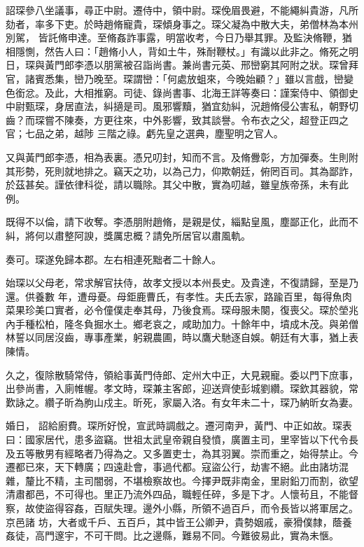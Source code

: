 \begin{pinyinscope}
 詔琛參八坐議事，尋正中尉。遷侍中，領中尉。琛俛眉畏避，不能繩糾貴游，凡所劾者，率多下吏。於時趙脩寵貴，琛傾身事之。琛父凝為中散大夫，弟僧林為本州別駕，
 皆託脩申達。至脩姦詐事露，明當收考，今日乃舉其罪。及監決脩鞭，猶相隱惻，然告人曰：「趙脩小人，背如土牛，殊耐鞭杖。」有識以此非之。脩死之明日，琛與黃門郎李憑以朋黨被召詣尚書。兼尚書元英、邢巒窮其阿附之狀。琛曾拜官，諸賓悉集，巒乃晚至。琛謂巒：「何處放蛆來，今晚始顧？」雖以言戲，巒變色銜忿。及此，大相推窮。司徒、錄尚書事、北海王詳等奏曰：謹案侍中、領御史中尉甄琛，身居直法，糾擿是司。風邪響黷，猶宜劾糾，況趙脩侵公害私，朝野切齒？而琛嘗不陳奏，方更往來，中外影響，致其談譽。令布衣之父，超登正四之官；七品之弟，越陟
 三階之祿。虧先皇之選典，塵聖明之官人。



 又與黃門郎李憑，相為表裏。憑兄叨封，知而不言。及脩釁彰，方加彈奏。生則附其形勢，死則就地排之。竊天之功，以為己力，仰欺朝廷，俯罔百司。其為鄙詐，於茲甚矣。謹依律科從，請以職除。其父中散，實為叨越，雖皇族帝孫，未有此例。



 既得不以倫，請下收奪。李憑朋附趙脩，是親是仗，緇點皇風，塵鄙正化，此而不糾，將何以肅整阿諛，獎厲忠概？請免所居官以肅風軌。



 奏可。琛遂免歸本郡。左右相連死黜者二十餘人。



 始琛以父母老，常求解官扶侍，故孝文授以本州長史。及貴達，不復請歸，至是乃還。供養數
 年，遭母憂。母鉅鹿曹氏，有孝性。夫氏去家，路踰百里，每得魚肉菜果珍美口實者，必令僮僕走奉其母，乃後食焉。琛母服未闋，復喪父。琛於塋兆內手種松柏，隆冬負掘水土。鄉老哀之，咸助加力。十餘年中，墳成木茂。與弟僧林誓以同居沒齒，專事產業，躬親農圃，時以鷹犬馳逐自娛。朝廷有大事，猶上表陳情。



 久之，復除散騎常侍，領給事黃門侍郎、定州大中正，大見親寵。委以門下庶事，出參尚書，入廁帷幄。孝文時，琛兼主客郎，迎送齊使彭城劉纘。琛欽其器貌，常歎詠之。纘子昕為朐山戍主。昕死，家屬入洛。有女年未二十，琛乃納昕女為妻。



 婚日，
 詔給廚費。琛所好悅，宣武時調戲之。遷河南尹，黃門、中正如故。琛表曰：國家居代，患多盜竊。世祖太武皇帝親自發憤，廣置主司，里宰皆以下代令長及五等散男有經略者乃得為之。又多置吏士，為其羽翼。崇而重之，始得禁止。今遷都已來，天下轉廣；四遠赴會，事過代都。寇盜公行，劫害不絕。此由諸坊混雜，釐比不精，主司闇弱，不堪檢察故也。今擇尹既非南金，里尉鉛刀而割，欲望清肅都邑，不可得也。里正乃流外四品，職輕任碎，多是下才。人懷茍且，不能督察，故使盜得容姦，百賦失理。邊外小縣，所領不過百戶，而令長皆以將軍居之。京邑諸
 坊，大者或千戶、五百戶，其中皆王公卿尹，貴勢姻戚，豪猾僕隸，蔭養姦徒，高門邃宇，不可干問。比之邊縣，難易不同。今難彼易此，實為未愜。




\end{pinyinscope}
